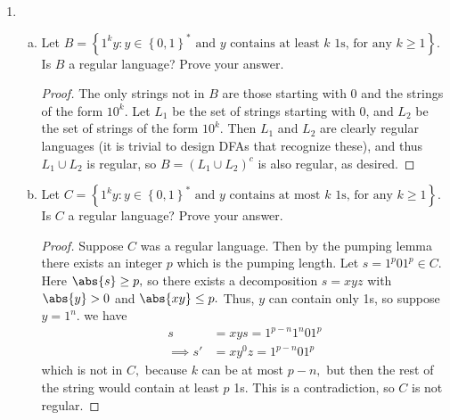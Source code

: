 \documentclass{article}
\begin{document}
\begin{enumerate}
\begin{enumerate}[(a)]
		\end{enumerate}

	\item
		\begin{enumerate}[(a)]
			\item Let $B=\left\{ 1^k y:y\in\left\{ 0, 1 \right\}^*\text{ and } y\text{ contains at least }k\text{ 1s, for any }k\ge 1 \right\}.$ Is $B$ a regular language? Prove your answer.
				\begin{proof}
					The only strings not in $B$ are those starting with 0 and the strings of the form $10^k.$ Let $L_1$ be the set of strings starting with 0, and $L_2$ be the set of strings of the form $10^k.$ Then $L_1$ and $L_2$ are clearly regular languages (it is trivial to design DFAs that recognize these), and thus $L_1\cup L_2$ is regular, so $B=\left( L_1\cup L_2 \right)^c$ is also regular, as desired.
				\end{proof}

			\item Let $C=\left\{ 1^k y:y\in\left\{ 0, 1 \right\}^*\text{ and } y\text{ contains at most }k\text{ 1s, for any }k\ge 1 \right\}.$ Is $C$ a regular language? Prove your answer.
				\begin{proof}
					Suppose $C$ was a regular language. Then by the pumping lemma there exists an integer $p$ which is the pumping length. Let $s=1^p01^p\in C.$ Here $\abs{s}\ge p,$ so there exists a decomposition $s=xyz$ with $\abs{y}>0$ and $\abs{xy}\le p.$ Thus, $y$ can contain only 1s, so suppose $y=1^n.$ we have
					\begin{align*}
						s &= xys = 1^{p-n}1^n01^{p} \\
						\implies s' &= xy^0z = 1^{p-n}01^{p}
					\end{align*}
					which is not in $C,$ because $k$ can be at most $p-n,$ but then the rest of the string would contain at least $p$ 1s. This is a contradiction, so $C$ is not regular.
				\end{proof}

		\end{enumerate}


\end{enumerate}
\end{document}
